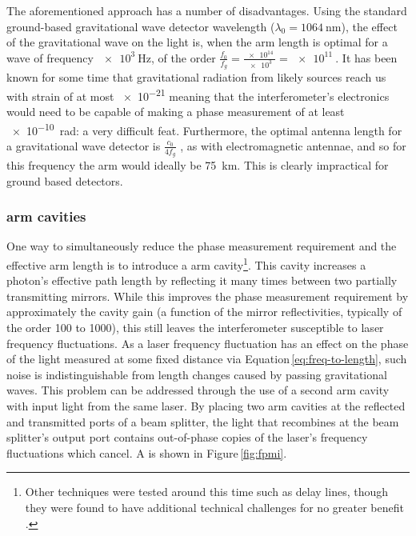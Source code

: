 The aforementioned approach has a number of disadvantages. Using the standard ground-based gravitational wave detector wavelength ($\lambda_0 = \SI{1064}{\nano\meter}$), the effect of the gravitational wave on the light is, when the arm length is optimal for a wave of frequency $\SI{e3}{\hertz}$, of the order $\frac{f_0}{f_g} = \frac{\SI{e14}{}}{\SI{e3}{}} = \SI{e11}{}$. It has been known for some time  that gravitational radiation from likely sources reach us with strain of at most \SI{e-21}{} meaning that the interferometer's electronics would need to be capable of making a phase measurement of at least \SI{e-10}{\radian}: a very difficult feat. Furthermore, the optimal antenna length for a gravitational wave detector is $\frac{c_0}{4 f_g}$ \cite{Abbott2016a}, as with electromagnetic antennae, and so for this frequency the arm would ideally be \SI{75}{\kilo\meter}. This is clearly impractical for ground based detectors.

\subsubsection{\label{sec:fabry-perot-cavities}\FP{} arm cavities}
One way to simultaneously reduce the phase measurement requirement and the effective arm length is to introduce a \FP{} arm cavity\footnote{Other techniques were tested around this time such as delay lines, though they were found to have additional technical challenges for no greater benefit .}. This cavity increases a photon's effective path length by reflecting it many times between two partially transmitting mirrors. While this improves the phase measurement requirement by approximately the cavity gain (a function of the mirror reflectivities, typically of the order \num{100} to \num{1000}), this still leaves the interferometer susceptible to laser frequency fluctuations. As a laser frequency fluctuation has an effect on the phase of the light measured at some fixed distance via Equation\,\ref{eq:freq-to-length}, such noise is indistinguishable from length changes caused by passing gravitational waves. This problem can be addressed through the use of a second \FP{} arm cavity with input light from the same laser. By placing two arm cavities at the reflected and transmitted ports of a beam splitter, the light that recombines at the beam splitter's output port contains out-of-phase copies of the laser's frequency fluctuations which cancel. A \emph{\FPMI{}} is shown in Figure\,\ref{fig:fpmi}.


